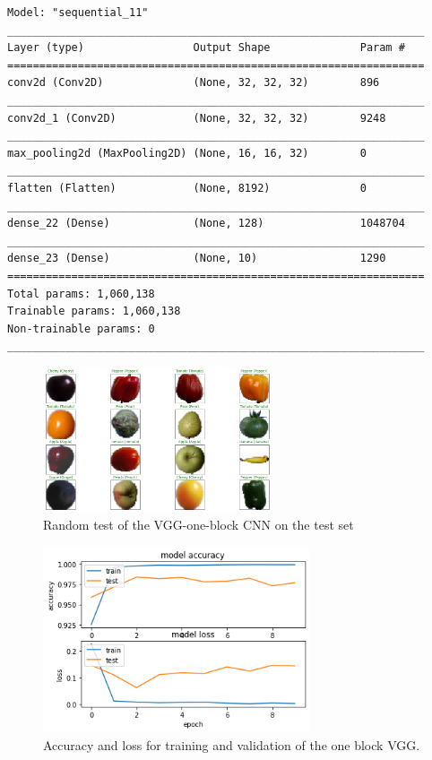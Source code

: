 \documentclass[10pt,english, openany]{book}
\begin{document}
\begin{verbatim}
Model: "sequential_11"
_________________________________________________________________
Layer (type)                 Output Shape              Param #   
=================================================================
conv2d (Conv2D)              (None, 32, 32, 32)        896       
_________________________________________________________________
conv2d_1 (Conv2D)            (None, 32, 32, 32)        9248      
_________________________________________________________________
max_pooling2d (MaxPooling2D) (None, 16, 16, 32)        0         
_________________________________________________________________
flatten (Flatten)            (None, 8192)              0         
_________________________________________________________________
dense_22 (Dense)             (None, 128)               1048704   
_________________________________________________________________
dense_23 (Dense)             (None, 10)                1290      
=================================================================
Total params: 1,060,138
Trainable params: 1,060,138
Non-trainable params: 0
_________________________________________________________________
\end{verbatim}



\begin{figure}[H]
    \centering
    \includegraphics[width=0.6\textwidth]{Images/2.1. random predicte img VGG.png}
    \caption{Random test of the VGG-one-block CNN on the test set}
\end{figure}

\begin{figure}[H]
    \centering
    \includegraphics[width=0.7\textwidth]{Images/2.2 Accuracy Loss VGG 1.png}
    \caption{\label{fig:5.4}Accuracy and loss for training and validation of the one block VGG.}
\end{figure}
\end{document}
